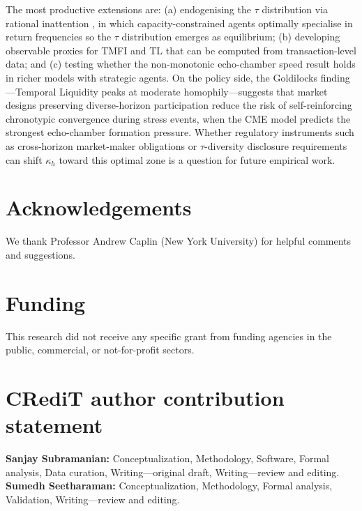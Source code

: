 \documentclass[preprint,12pt,authoryear]{elsarticle}
\begin{document}
The most productive extensions are: (a) endogenising the $\tau$ distribution
via rational inattention \citep{sims2003}, in which capacity-constrained
agents optimally specialise in return frequencies so the $\tau$ distribution
emerges as equilibrium; (b) developing observable proxies for TMFI and TL
that can be computed from transaction-level data; and (c) testing whether
the non-monotonic echo-chamber speed result holds in richer models with
strategic agents.
On the policy side, the Goldilocks finding---Temporal Liquidity peaks at
moderate homophily---suggests that market designs preserving diverse-horizon
participation reduce the risk of self-reinforcing chronotypic convergence
during stress events, when the CME model predicts the strongest echo-chamber
formation pressure.
Whether regulatory instruments such as cross-horizon market-maker
obligations or $\tau$-diversity disclosure requirements can shift
$\kappa_h$ toward this optimal zone is a question for future empirical work.

\section*{Acknowledgements}

We thank Professor Andrew Caplin (New York University) for helpful comments and suggestions.

\section*{Funding}

This research did not receive any specific grant from funding agencies
in the public, commercial, or not-for-profit sectors.

\section*{CRediT author contribution statement}

\textbf{Sanjay Subramanian:} Conceptualization, Methodology, Software,
Formal analysis, Data curation, Writing---original draft,
Writing---review and editing.
\textbf{Sumedh Seetharaman:} Conceptualization, Methodology,
Formal analysis, Validation, Writing---review and editing.

\end{document}
